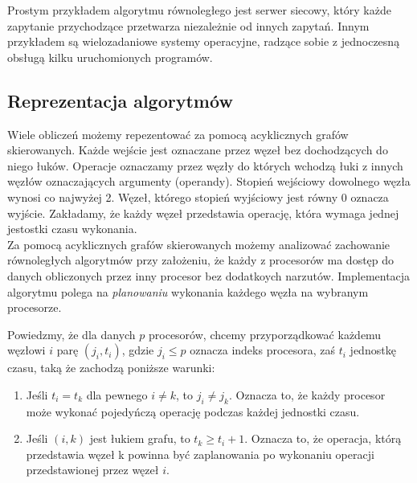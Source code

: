 \begin{przyklad}
Prostym przykładem algorytmu równoległego jest serwer siecowy, który każde zapytanie przychodzące przetwarza niezależnie od innych zapytań. Innym przykładem są wielozadaniowe systemy operacyjne, radzące sobie z jednoczesną obsługą kilku uruchomionych programów.
\end{przyklad}
%
%
%
%

\subsection{Reprezentacja algorytmów}


Wiele obliczeń możemy repezentować za pomocą acyklicznych grafów skierowanych. Każde wejście jest oznaczane przez węzeł bez dochodzących do niego łuków. Operacje oznaczamy przez węzły do których wchodzą łuki z innych węzłów oznaczających argumenty (operandy). Stopień wejściowy dowolnego węzła wynosi co najwyżej 2. Węzeł, którego stopień wyjściowy jest równy 0 oznacza wyjście. Zakładamy, że każdy węzeł przedstawia operację, która wymaga jednej jestostki czasu wykonania.\\



Za pomocą acyklicznych grafów skierowanych możemy analizować zachowanie równoległych algorytmów przy założeniu, że każdy z procesorów ma dostęp do danych obliczonych przez inny procesor bez dodatkoych narzutów. Implementacja algorytmu polega na \emph{planowaniu} wykonania każdego węzła na wybranym procesorze.

Powiedzmy, że dla danych \(p\) procesorów, chcemy przyporządkować każdemu węzłowi \(i\) parę \((j_i, t_i)\), gdzie \(j_i \leq p\) oznacza indeks procesora, zaś \(t_i\) jednostkę czasu, taką że zachodzą poniższe warunki:
\begin{enumerate}
\item Jeśli \(t_i=t_k\) dla pewnego \(i\neq k\), to \(j_i\neq j_k\). Oznacza to, że każdy procesor może wykonać pojedyńczą operację podczas każdej jednostki czasu.
\item Jeśli \((i, k)\) jest łukiem grafu, to \(t_k\geq t_i + 1\). Oznacza to, że operacja, którą przedstawia węzeł k powinna być zaplanowania po wykonaniu operacji przedstawionej przez węzeł \(i\).
\end{enumerate}

